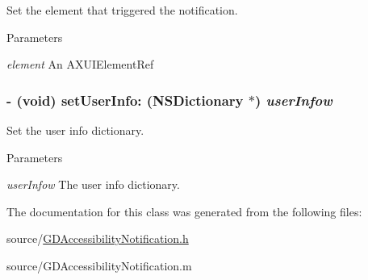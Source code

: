 Set the element that triggered the notification. 
\begin{DoxyParams}{Parameters}
\item[{\em element}]An AXUIElementRef \end{DoxyParams}
\hypertarget{interface_g_d_accessibility_notification_ac44eebad792940c9f430ab0274f0dedf}{
\subsubsection[{setUserInfo:}]{\setlength{\rightskip}{0pt plus 5cm}-\/ (void) setUserInfo: (NSDictionary $\ast$) {\em userInfow}}}
\label{interface_g_d_accessibility_notification_ac44eebad792940c9f430ab0274f0dedf}


Set the user info dictionary. 
\begin{DoxyParams}{Parameters}
\item[{\em userInfow}]The user info dictionary. \end{DoxyParams}


The documentation for this class was generated from the following files:\begin{DoxyCompactItemize}
\item 
source/\hyperlink{_g_d_accessibility_notification_8h}{GDAccessibilityNotification.h}\item 
source/GDAccessibilityNotification.m\end{DoxyCompactItemize}

